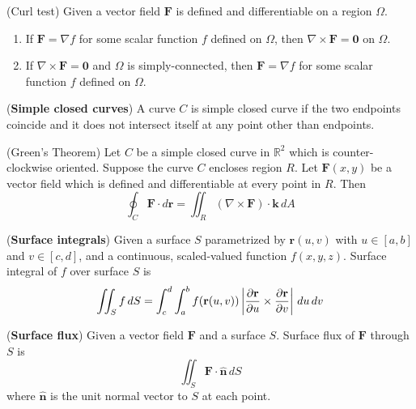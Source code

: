 \documentclass{huhtakm-template-book}
\begin{document}
\newpage
\begin{thm}(Curl test)
    Given a vector field $\mathbf{F}$ is defined and differentiable on a region $\Omega$.
    \begin{enumerate}
        \item If $\mathbf{F}=\nabla f$ for some scalar function $f$ defined on $\Omega$, then $\nabla\times\mathbf{F}=\mathbf{0}$ on $\Omega$.
        \item If $\nabla\times\mathbf{F}=\mathbf{0}$ and $\Omega$ is simply-connected, then $\mathbf{F}=\nabla f$ for some scalar function $f$ defined on $\Omega$.
    \end{enumerate}
\end{thm}
\begin{defn}(\textbf{Simple closed curves})
    A curve $C$ is simple closed curve if the two endpoints coincide and it does not intersect itself at any point other than endpoints.
\end{defn}
\begin{thm}(Green's Theorem)
    Let $C$ be a simple closed curve in $\mathbb{R}^{2}$ which is counter-clockwise oriented. Suppose the curve $C$ encloses region $R$. Let $\mathbf{F}(x,y)$ be a vector field which is defined and differentiable at every point in $R$. Then
    \begin{equation*}
        \oint_{C}\mathbf{F}\cdot d\mathbf{r}=\iint_{R}(\nabla\times\mathbf{F})\cdot\mathbf{k}\,dA
    \end{equation*}
\end{thm}
\begin{defn}(\textbf{Surface integrals})
    Given a surface $S$ parametrized by $\mathbf{r}(u,v)$ with $u\in[a,b]$ and $v\in[c,d]$, and a continuous, scaled-valued function $f(x,y,z)$. Surface integral of $f$ over surface $S$ is
    \begin{equation*}
        \iint_{S}f\,dS=\int_{c}^{d}\int_{a}^{b}f(\mathbf{r}(u,v))\left|{\pdv{\mathbf{r}}{u}\times\pdv{\mathbf{r}}{v}}\right|\,du\,dv
    \end{equation*}
\end{defn}
\begin{defn}(\textbf{Surface flux})
    Given a vector field $\mathbf{F}$ and a surface $S$. Surface flux of $\mathbf{F}$ through $S$ is
    \begin{equation*}
        \iint_{S}\mathbf{F}\cdot\mathbf{\hat{n}}\,dS
    \end{equation*}
    where $\mathbf{\hat{n}}$ is the unit normal vector to $S$ at each point.
\end{defn}
\end{document}
